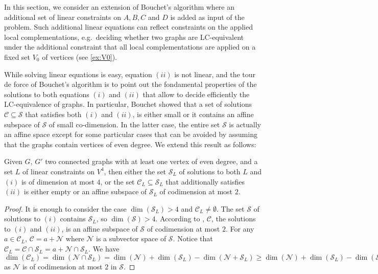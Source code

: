 \documentclass[a4paper,UKenglish,cleveref,autoref,thm-restate]{arxiv}
\begin{document}
In this section, we consider an extension of Bouchet's algorithm where an additional set of linear constraints on $A,B,C$ and $D$ is added as input of the problem. Such additional linear equations can reflect constraints on the applied  local complementations, e.g.~deciding whether two graphs are LC-equivalent under the additional constraint that all local complementations are applied on a fixed set $V_0$ of vertices (see \cref{ex:V0}).



While solving linear equations is easy, equation $(ii)$ is not linear, and the tour de force of Bouchet's algorithm is to point out the fondamental properties of the solutions to both equations $(i)$ and $(ii)$ that allow to decide efficiently the LC-equivalence of graphs.  In particular, Bouchet showed that a set of solutions $\mathcal C\subseteq \mathcal S$ that satisfies both $(i)$ and $(ii)$,  is either small or it contains an affine subspace of $\mathcal S$ of small co-dimension. In  the latter case, the entire set $\mathcal S$ is  actually an affine space except for  some particular cases that can be avoided by assuming that the graphs contain vertices of even degree. We extend this result as follows:

\begin{lemma}\label{lemma:codim2}
Given $G$, $G'$ two connected graphs with at least one vertex of even degree, and a set $L$  of linear constraints on $V^4$,
 then either the set $\mathcal S_L$ of solutions to both $ L$ and $(i)$ is of dimension at most $4$, 
 or the set  $\mathcal C_L\subseteq \mathcal S_L$ that additionally satisfies  $(ii)$ is either empty or an affine subspace of $\mathcal S_L$ of codimension at most $2$.   
\end{lemma}

\begin{proof} It is enough to consider the case $\dim(\mathcal S_L)>4$ and $\mathcal C_L\neq \emptyset$. The set  $\mathcal S$ of solutions to $(i)$ contains $\mathcal S_L$, so $\dim(\mathcal S)>4$. According to \cite{Bouchet1991}, $\mathcal C$, the solutions to $(i)$ and $(ii)$, is an affine subspace of $\mathcal S$ of codimension at most $2$. For any  $a\in \mathcal C_L$, $\mathcal C = a+ \mathcal N$ where $ \mathcal N$ is a subvector space of $\mathcal S$. Notice that $\mathcal C_L = \mathcal C\cap \mathcal S_L = a+ \mathcal N\cap \mathcal S_L $. We have $\dim(\mathcal C_L)=\dim(\mathcal N\cap \mathcal S_L ) = \dim(\mathcal N)+\dim(\mathcal S_L )-\dim(\mathcal N + \mathcal S_L )\ge \dim(\mathcal N)+\dim(\mathcal S_L )-\dim(\mathcal S)\ge \dim(\mathcal S_L)-2$ as $\mathcal N$ is of codimension at most $2$ in $\mathcal S$. 
\end{proof}
\end{document}
